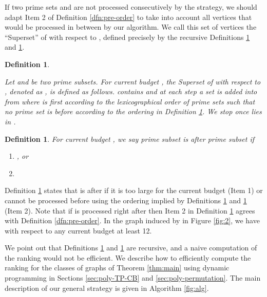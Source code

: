 \documentclass[letterpaper,11pt,abstracton]{scrartcl}
\newtheorem{dfn}[theorem]{Definition}
\begin{document}
If two prime sets  and  are not processed consecutively by the
 strategy, we should adapt Item 2 of Definition
\ref{dfn:pre-order} to take into account all vertices that would be
processed in between by our algorithm.  We call this set of vertices
the ``Superset'' of  with respect to , defined precisely by the recursive
Definitions \ref{dfn:superset} and \ref{dfn:order}.




\begin{dfn} \label{dfn:superset}


Let  and  be two prime subsets. For current budget , the \emph{Superset of  with respect to , denoted as ,} is defined as follows.
 contains  and at each step a set  is added into  from  where  is first according to the lexicographical order of prime sets such that no prime set is before    according to the ordering in Definition \ref{dfn:order}.
We stop once  lies in .

\end{dfn}



\begin{dfn}\label{dfn:order}
For current budget , we say prime subset  is {\em after} prime subset  if
\begin{enumerate}
\item , or


\item  

 \end{enumerate}
\end{dfn}

Definition \ref{dfn:order} states that  is after  if it is too
large for the current budget (Item 1) or cannot be processed before
 using the ordering implied by Definitions \ref{dfn:superset} and
\ref{dfn:order} (Item 2).
Note that if  is processed right after  then Item 2 in Definition \ref{dfn:order} agrees with
Definition \ref{dfn:pre-order}. In the graph induced by  in Figure \ref{fig:2}, we have  with respect to any current budget  at least 12.

We point out that Definitions \ref{dfn:superset} and \ref{dfn:order} are
recursive, and a naive computation of the ranking would not be efficient.
We describe how to efficiently compute the ranking for the classes of graphs of Theorem \ref{thm:main} using
dynamic programming in Sections \ref{sec:poly-TP-CB} and \ref{sec:poly-permutation}. The main description of our general strategy is given in Algorithm \ref{fig:alg}.
\end{document}
